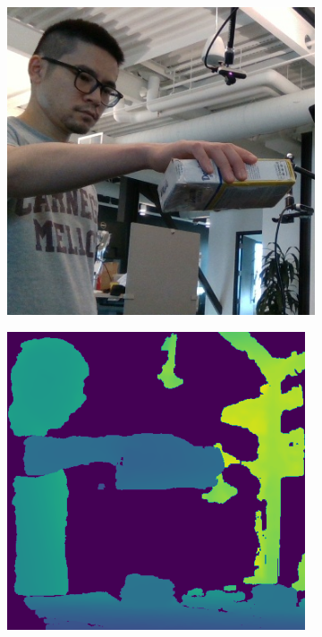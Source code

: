 \begin{figure}[h!]
    \begin{subfigure}[b]{0.16\linewidth}
    \includegraphics[width=0.98\linewidth]{figs/5319_rgb}
  \end{subfigure}
  \begin{subfigure}[b]{0.16\linewidth}
    \includegraphics[width=0.98\linewidth]{figs/5319_depth2}

\end{subfigure}
\end{figure}
